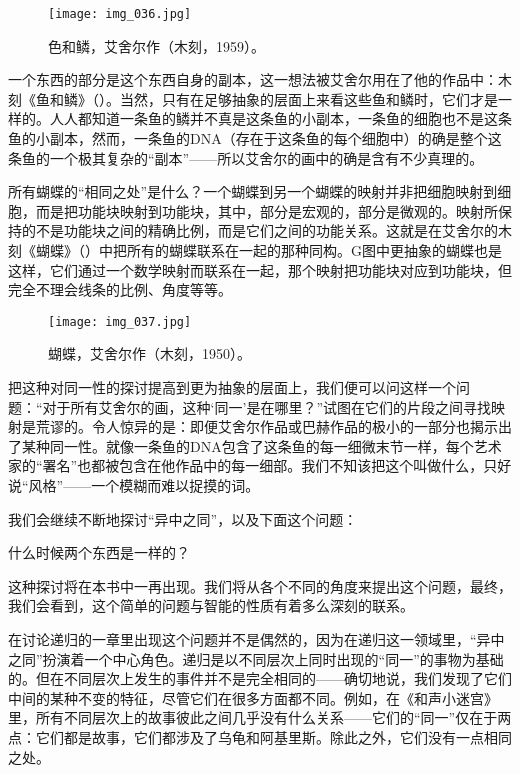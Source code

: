 \begin{figure}
\texttt{[image: img\_036.jpg]}
\caption[鱼和鳞，艾舍尔作。]
  {色和鳞，艾舍尔作（木刻，1959）。}
\end{figure}

一个东西的部分是这个东西自身的副本，这一想法被艾舍尔用在了他的作品中：木刻《鱼和鳞》（）。当然，只有在足够抽象的层面上来看这些鱼和鳞时，它们才是一样的。人人都知道一条鱼的鳞并不真是这条鱼的小副本，一条鱼的细胞也不是这条鱼的小副本，然而，一条鱼的DNA（存在于这条鱼的每个细胞中）的确是整个这条鱼的一个极其复杂的“副本”——所以艾舍尔的画中的确是含有不少真理的。

所有蝴蝶的“相同之处”是什么？一个蝴蝶到另一个蝴蝶的映射并非把细胞映射到细胞，而是把功能块映射到功能块，其中，部分是宏观的，部分是微观的。映射所保持的不是功能块之间的精确比例，而是它们之间的功能关系。这就是在艾舍尔的木刻《蝴蝶》（）中把所有的蝴蝶联系在一起的那种同构。G图中更抽象的蝴蝶也是这样，它们通过一个数学映射而联系在一起，那个映射把功能块对应到功能块，但完全不理会线条的比例、角度等等。

\begin{figure}
\texttt{[image: img\_037.jpg]}
\caption[蝴蝶，艾舍尔作。]
  {蝴蝶，艾舍尔作（木刻，1950）。}
\end{figure}

把这种对同一性的探讨提高到更为抽象的层面上，我们便可以问这样一个问题：“对于所有艾舍尔的画，这种‘同一’是在哪里？”试图在它们的片段之间寻找映射是荒谬的。令人惊异的是：即便艾舍尔作品或巴赫作品的极小的一部分也揭示出了某种同一性。就像一条鱼的DNA包含了这条鱼的每一细微末节一样，每个艺术家的“署名”也都被包含在他作品中的每一细部。我们不知该把这个叫做什么，只好说“风格”——一个模糊而难以捉摸的词。

我们会继续不断地探讨“异中之同”，以及下面这个问题：

\begin{block}
什么时候两个东西是一样的？
\end{block}
这种探讨将在本书中一再出现。我们将从各个不同的角度来提出这个问题，最终，我们会看到，这个简单的问题与智能的性质有着多么深刻的联系。

在讨论递归的一章里出现这个问题并不是偶然的，因为在递归这一领域里，“异中之同”扮演着一个中心角色。递归是以不同层次上同时出现的“同一”的事物为基础的。但在不同层次上发生的事件并不是完全相同的——确切地说，我们发现了它们中间的某种不变的特征，尽管它们在很多方面都不同。例如，在《和声小迷宫》里，所有不同层次上的故事彼此之间几乎没有什么关系——它们的“同一”仅在于两点：它们都是故事，它们都涉及了乌龟和阿基里斯。除此之外，它们没有一点相同之处。

